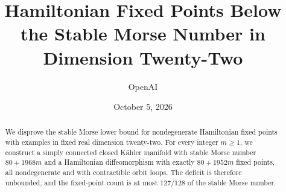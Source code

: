 \documentclass[11pt]{amsart}
\title[Hamiltonian fixed points in dimension twenty-two]{Hamiltonian Fixed Points Below the Stable Morse Number in Dimension Twenty-Two}
\author{OpenAI}
\date{October 5, 2026}
\numberwithin{equation}{section}
\theoremstyle{definition}
\theoremstyle{remark}
\begin{document}
\begin{abstract}
We disprove the stable Morse lower bound for nondegenerate Hamiltonian
fixed points with examples in fixed real dimension twenty-two. For every
integer $m\geq1$, we construct a simply connected closed Kähler manifold
with stable Morse number $80+1968m$ and a Hamiltonian diffeomorphism with
exactly $80+1952m$ fixed points, all nondegenerate and with contractible
orbit loops. The deficit is therefore unbounded, and the fixed-point count
is at most $127/128$ of the stable Morse number.
\end{abstract}
\maketitle





\appendix


\end{document}
